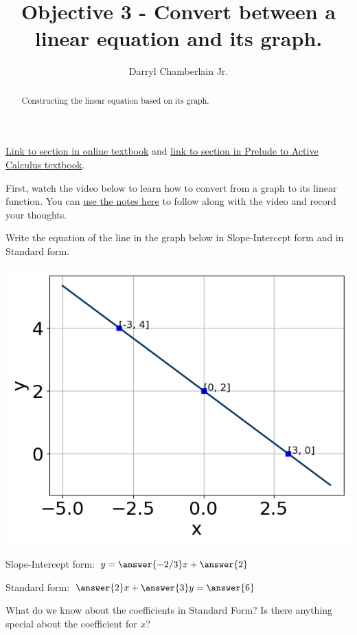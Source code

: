 \documentclass{ximera}
\author{Darryl Chamberlain Jr.}
\title{Objective 3 - Convert between a linear equation and its graph.}
\begin{document}
\begin{abstract}
Constructing the linear equation based on its graph. 
\end{abstract}
\maketitle

\href{https://cnx.org/contents/mwjClAV_@8.1:62_eXnY6@14/Linear-Equations-in-One-Variable}{Link to section in online textbook} and
\href{https://activecalculus.org/prelude/sec-changing-linear.html}{link to section in Prelude to Active Calculus textbook}.


First, watch the video below to learn how to convert from a graph to its linear function. You can \href{http://people.clas.ufl.edu/dchamberlain31/files/Objective-3-Converting-between-representations.pdf}{use the notes here} to follow along with the video and record your thoughts.



\begin{question}
Write the equation of the line in the graph below in Slope-Intercept form and in Standard form. 

\includegraphics[scale=0.5]{question1.png}

Slope-Intercept form: $y = \answer{-2/3}x + \answer{2}$

Standard form: $\answer{2} x + \answer{3} y = \answer{6}$

\begin{hint}
	What do we know about the coefficients in Standard Form? Is there anything special about the coefficient for $x$?
\end{hint}
\end{question}
\end{document}
